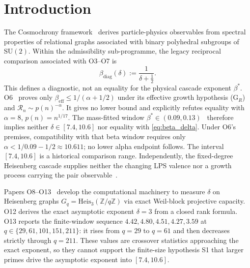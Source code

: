 \documentclass[11pt]{article}
\begin{document}
  \section{Introduction}
  \label{sec:intro}

  The Cosmochrony framework~\cite{Cosmochrony,Beau2026c} derives particle-physics observables from
  spectral properties of relational graphs associated with binary polyhedral subgroups of
  $\mathrm{SU}(2)$.
  Within the admissibility sub-programme, the legacy reciprocal comparison associated with
  O3--O7 is
  \begin{equation}
    \label{eq:beta_delta}
    \beta_{\mathrm{diag}}(\delta) := \frac{1}{\delta + \tfrac{1}{2}}.
  \end{equation}
  This defines a diagnostic, not an equality for the physical cascade exponent $\beta^{*}$.
  O6~\cite{Beau2026a10} proves only $\beta_{\mathrm{eff}}\leq1/(\alpha+1/2)$ under its
  effective growth hypothesis (G$_R$) and $\mathcal R_n\sim p(n)^{-\alpha}$.
  It gives no lower bound and explicitly refutes equality with $\alpha=8$, $p(n)=n^{1/17}$.
  The mass-fitted window $\beta^{*}\in(0.09,0.13)$~\cite{Beau2026a7} therefore implies neither
  $\delta\in[7.4,10.6]$ nor equality with \eqref{eq:beta_delta}.
  Under O6's premises, compatibility with that beta window requires only
  $\alpha<1/0.09-1/2\approx10.611$; no lower alpha endpoint follows.
  The interval $[7.4,10.6]$ is a historical comparison range.
  Independently, the fixed-degree Heisenberg cascade supplies neither the changing LPS valence
  nor a growth process carrying the pair observable~\cite{Beau2026sgn}.

  Papers O8--O13~\cite{Beau2026a12,Beau2026a13,Beau2026a14,Beau2026a15,Beau2026a16,Beau2026a17}
  develop the computational machinery to measure $\delta$ on Heisenberg graphs
  $G_q = \mathrm{Heis}_3(\mathbb{Z}/q\mathbb{Z})$ via exact Weil-block projective capacity.
  O12 derives the exact asymptotic exponent $\delta=3$ from a closed rank formula.
  O13 reports the finite-window sequence $4.42,4.80,4.51,4.27,3.59$ at
  $q\in\{29,61,101,151,211\}$: it rises from $q=29$ to $q=61$ and then decreases strictly through
  $q=211$.
  These values are crossover statistics approaching the exact exponent, so they cannot support the
  finite-size hypothesis S1 that larger primes drive the asymptotic exponent into $[7.4,10.6]$.
\end{document}
